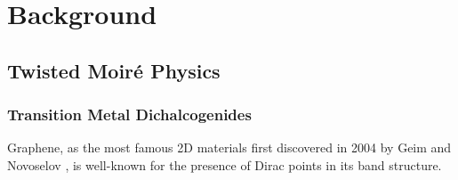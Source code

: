 \chapter{Background}
\section{Twisted Moir\'e Physics}
\subsection{Transition Metal Dichalcogenides}
Graphene, as the most famous 2D materials first discovered in 2004 by Geim and Novoselov \cite{novoselov2004electric}, is well-known for the presence of Dirac points in its band structure.


